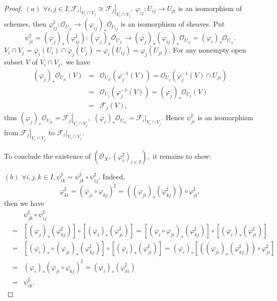 \begin{proof}
$(a)$ $\forall i,j\in I, \left.\mathscr{F}_i\right|_{V_i\cap
V_j}\cong \left.\mathscr{F}_j\right|_{V_i\cap V_j}.$ $\varphi_{ij}:
U_{ij}\rightarrow U_{ji}$ is an isomorphism of schemes, then
$\varphi_{ij}^{\sharp}:\mathcal {O}_{U_{ji}}\rightarrow
(\varphi_{ij})_{\ast}\mathcal {O}_{U_{ij}}$ is an isomorphism of
sheaves. Put
$$\psi_{ji}^{\sharp}=(\varphi_j)_{\ast}(\varphi_{ij}^{\sharp}):
(\varphi_j)_{\ast}\mathcal {O}_{U_{ji}}\rightarrow
(\varphi_j)_{\ast}(\varphi_{ij})_{\ast}\mathcal {O}_{U_{ij}} =
(\varphi_i)_{\ast}\mathcal {O}_{U_{ij}}.$$ $V_i\cap
V_j=\varphi_i(U_i)\cap
\varphi_j(U_j)=\varphi_i(U_{ij})=\varphi_j(U_{ji}).$ For any
nonempty open subset $V$ of $V_i\cap V_j,$ we have
\begin{eqnarray*}
(\varphi_j)_{\ast}\mathcal {O}_{U_{ji}}(V) & = & \mathcal
{O}_{U_{ji}}(\varphi_j^{-1}(V)) = \mathcal
{O}_{U_j}(\varphi_j^{-1}(V)\cap U_{ji})                 \\
& = & \mathcal {O}_{U_j}(\varphi_j^{-1}(V)) =
(\varphi_j)_{\ast}\mathcal {O}_{U_j}(V)                 \\
& = & \mathscr{F}_j(V),
\end{eqnarray*}
thus $(\varphi_j)_{\ast}\mathcal {O}_{U_{ji}} =
\left.\mathscr{F}_j\right|_{V_i\cap V_j},$
$(\varphi_i)_{\ast}\mathcal {O}_{U_{ij}} =
\left.\mathscr{F}_i\right|_{V_i\cap V_j}.$ Hence
$\psi_{ji}^{\sharp}$ is an isomorphism from
$\left.\mathscr{F}_j\right|_{V_i\cap V_j}$ to
$\left.\mathscr{F}_i\right|_{V_i\cap V_j}.$

To conclude the existence of $(\mathcal
{O}_X,(\varphi_i^{\sharp})_{i\in I}),$ it remains to show:

$(b)$ $\forall i,j,k\in
I,\psi_{ik}^{\sharp}=\psi_{jk}^{\sharp}\circ\psi_{ij}^{\sharp}.$
Indeed,
$$\varphi_{ki}^{\sharp}=(\varphi_{ji}\circ\varphi_{kj})^{\sharp}=
((\varphi_{ji})_{\ast}(\varphi_{kj}^{\sharp}))\circ\varphi_{ji}^{\sharp},$$
then we have
\begin{eqnarray*}
& & \psi_{jk}^{\sharp}\circ\psi_{ij}^{\sharp} \\
& = & [(\varphi_j)_{\ast}(\varphi_{kj}^{\sharp})] \circ
[(\varphi_i)_{\ast}(\varphi_{ji}^{\sharp})] =
[(\varphi_i\circ\varphi_{ji})_{\ast}(\varphi_{kj}^{\sharp})] \circ
[(\varphi_i)_{\ast}(\varphi_{ji}^{\sharp})]                       \\
& = & [(\varphi_i)_{\ast}\circ
(\varphi_{ji})_{\ast}(\varphi_{kj}^{\sharp})] \circ
[(\varphi_i)_{\ast}(\varphi_{ji}^{\sharp})] =
(\varphi_i)_{\ast}[((\varphi_{ji})_{\ast}(\varphi_{kj}^{\sharp}))\circ\varphi_{ji}^{\sharp}]\\
& = & (\varphi_i)_{\ast}(\varphi_{ji}\circ\varphi_{kj})^{\sharp} =
(\varphi_i)_{\ast}(\varphi_{ki}^{\sharp})                 \\
& = & \psi_{ik}^{\sharp}.
\end{eqnarray*}


\end{proof}
